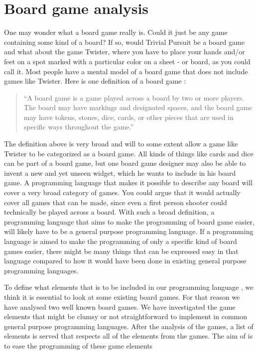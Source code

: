 \section{Board game analysis}
\label{sec:board-game-analysis}

One may wonder what a board game really is. Could it just be any game
containing some kind of a board? If so, would Trivial Pursuit be a board
game and what about the game Twister, where you have to place your hands
and/or feet on a spot marked with a particular color on a sheet - or
board, as you could call it. Most people have a mental model of a board
game that does not include games like Twister. Here is one definition of
a board game \cite{def-board-game}:

\begin{quote}
  ``A board game is a game played across a board by two or
  more players. The board may have markings and designated spaces, and the
  board game may have tokens, stones, dice, cards, or other pieces that
  are used in specific ways throughout the game.''
\end{quote}

The definition above is very broad and will to some extent allow a game
like Twister to be categorized as a board game. All kinds of things
like cards and dice can be part of a board game, but one board game
designer may also be able to invent a new and yet unseen widget, which
he wants to include in his board game. A programming language that makes
it possible to describe any board will cover a very broad category of
games. You could argue that it would actually cover all games that can
be made, since even a first person shooter could technically be played across a
board. With such a broad definition, a programming language that aims
to make the programming of board game easier, will likely have to be a general purpose programming language. If a programming
language is aimed to make the programming of only a specific kind of
board games easier, there might be many things that can be expressed easy in that language compared 
to how it would have been done in existing general purpose programming languages.

To define what elements that is to be included in our programming language \productname{}, we think it is essential to look at some existing board games. For that reason we have analysed two well known board games. We have investigated the game elements that might be clumsy or not straightforward to implement in common general purpose programming languages. After the analysis of the games, a list of elements is served that respects all of the elements from the games. The aim of \productname{} is to ease the programming of these game elements

